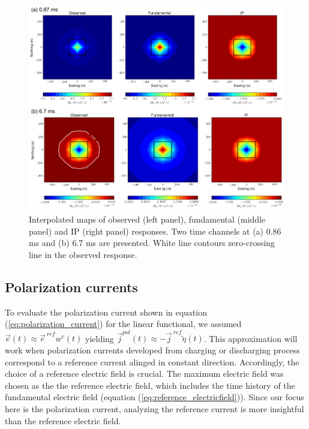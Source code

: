 \documentclass[a4paper, 11pt]{article}
\renewcommand {\j}  { {\vec j} }
\newcommand {\e}  { {\vec e} }
\newcommand{\peta}{\tilde{\eta}}
\newcommand{\eref}{\e^{\ ref}}
\begin{document}
\begin{figure}[htb]
  \centering
  \includegraphics[width=1.\textwidth]{figures/IPresp_Plan.png}
  \caption{Interpolated maps of observed (left panel), fundamental (middle panel) and IP (right panel) responses. Two time channels at (a) 0.86 ms and (b) 6.7 ms are presented. White line contours zero-crossing line in the observed response.  
  }
  \label{F:IPresp_Plan}
\end{figure}
\clearpage

\subsection{Polarization currents}
To evaluate the polarization current shown in equation (\ref{eq:polarization_current}) for the linear functional, we assumed $\e(t) \approx \eref w^e(t)$ yielding $\j^{pol}(t) \approx -\j^{\ ref} \peta(t)$. This approximation will work when polarization currents developed from charging or discharging process correspond to a reference current alinged in constant direction. Accordingly, the choice of a reference electric field is crucial. The maximum electric field was chosen as the the reference electric field, which includes the time history of the fundamental electric field (equation (\ref{eq:reference_electricfield})). Since our focus here is the polarization current, analyzing the reference current is more insightful than the reference electric field. 
\end{document}
